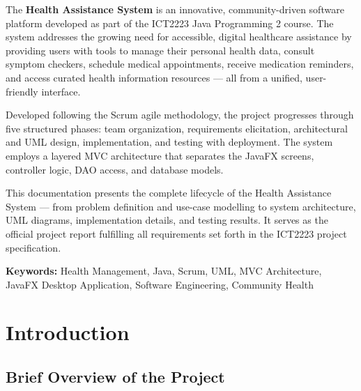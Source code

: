\documentclass[12pt,a4paper]{report}
\begin{document}
\begin{tcolorbox}[
  enhanced, breakable,
  colback=LightBlue, colframe=PrimaryBlue,
  arc=6pt, boxrule=1.5pt,
  left=16pt, right=16pt, top=14pt, bottom=14pt
]
The \textbf{Health Assistance System} is an innovative, community-driven software platform developed as part of the ICT2223 Java Programming 2 course. The system addresses the growing need for accessible, digital healthcare assistance by providing users with tools to manage their personal health data, consult symptom checkers, schedule medical appointments, receive medication reminders, and access curated health information resources --- all from a unified, user-friendly interface.

\medskip
Developed following the Scrum agile methodology, the project progresses through five structured phases: team organization, requirements elicitation, architectural and UML design, implementation, and testing with deployment. The system employs a layered MVC architecture that separates the JavaFX screens, controller logic, DAO access, and database models.

\medskip
This documentation presents the complete lifecycle of the Health Assistance System --- from problem definition and use-case modelling to system architecture, UML diagrams, implementation details, and testing results. It serves as the official project report fulfilling all requirements set forth in the ICT2223 project specification.
\end{tcolorbox}

\bigskip
\noindent\textbf{Keywords:} Health Management, Java, Scrum, UML, MVC Architecture, JavaFX Desktop Application, Software Engineering, Community Health

\tableofcontents
\clearpage

\chapter{Introduction}

\section{Brief Overview of the Project}
\end{document}

